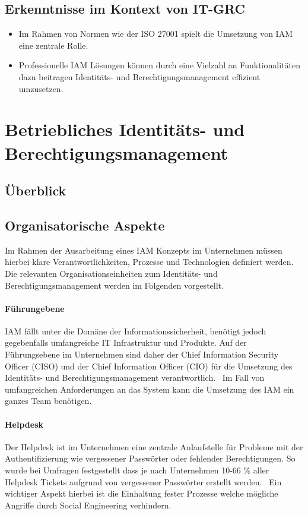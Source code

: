 \documentclass[12pt]{article}
\begin{document}
\subsection{Erkenntnisse im Kontext von IT-GRC}
\begin{itemize}
  \item Im Rahmen von Normen wie der ISO 27001 spielt die Umsetzung von IAM eine zentrale Rolle.
  \item Professionelle IAM Lösungen können durch eine Vielzahl an Funktionalitäten dazu beitragen Identitäts- und Berechtigungsmanagement effizient umzusetzen.
\end{itemize}
\section{Betriebliches Identitäts- und Berechtigungsmanagement}
\label{sec:betrieb}
\subsection{Überblick}
\subsection{Organisatorische Aspekte}
Im Rahmen der Ausarbeitung eines IAM Konzepts im Unternehmen müssen hierbei klare Verantwortlichkeiten, Prozesse und Technologien definiert werden. Die relevanten Organisationseinheiten zum Identitäts- und Berechtigungsmanagement werden im Folgenden vorgestellt.
\paragraph{Führungebene}
IAM fällt unter die Domäne der Informationssicherheit, benötigt jedoch gegebenfalls umfangreiche IT Infrastruktur und Produkte. Auf der Führungsebene im Unternehmen sind daher der Chief Information Security Officer (CISO) und der Chief Information Officer (CIO) für die Umsetzung des Identitäts- und Berechtigungsmanagement verantwortlich.~\cite{azhar2014economics}\cite{baldwin2009using} Im Fall von umfangreichen Anforderungen an das System kann die Umsetzung des IAM ein ganzes Team benötigen.~\cite{mohammed2011identity}
\paragraph{Helpdesk}
Der Helpdesk ist im Unternehmen eine zentrale Anlaufstelle für Probleme mit der Authentifizierung wie vergessener Passwörter oder fehlender Berechtigungen. So wurde bei Umfragen festgestellt dass je nach Unternehmen 10-66 \% aller Helpdesk Tickets aufgrund von vergessener Passwörter erstellt werden.~\cite{ylen2004centralized} Ein wichtiger Aspekt hierbei ist die Einhaltung fester Prozesse welche mögliche Angriffe durch Social Engineering verhindern.~\cite{wood2005implementing}
\end{document}
